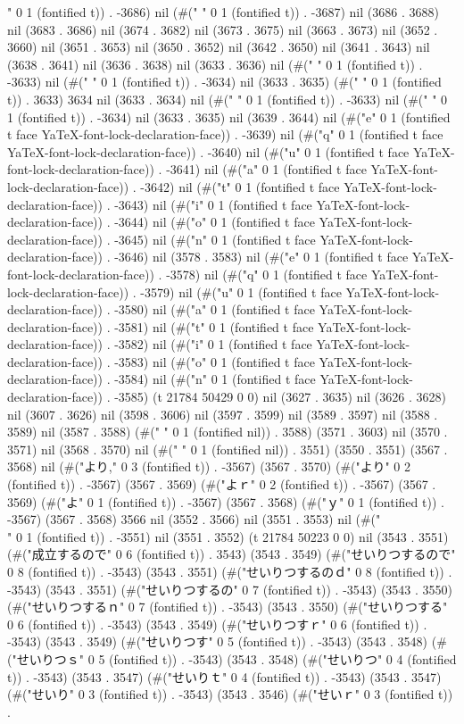 " 0 1 (fontified t)) . -3686) nil (#(" " 0 1 (fontified t)) . -3687) nil (3686 . 3688) nil (3683 . 3686) nil (3674 . 3682) nil (3673 . 3675) nil (3663 . 3673) nil (3652 . 3660) nil (3651 . 3653) nil (3650 . 3652) nil (3642 . 3650) nil (3641 . 3643) nil (3638 . 3641) nil (3636 . 3638) nil (3633 . 3636) nil (#("
" 0 1 (fontified t)) . -3633) nil (#(" " 0 1 (fontified t)) . -3634) nil (3633 . 3635) (#(" " 0 1 (fontified t)) . 3633) 3634 nil (3633 . 3634) nil (#("
" 0 1 (fontified t)) . -3633) nil (#(" " 0 1 (fontified t)) . -3634) nil (3633 . 3635) nil (3639 . 3644) nil (#("e" 0 1 (fontified t face YaTeX-font-lock-declaration-face)) . -3639) nil (#("q" 0 1 (fontified t face YaTeX-font-lock-declaration-face)) . -3640) nil (#("u" 0 1 (fontified t face YaTeX-font-lock-declaration-face)) . -3641) nil (#("a" 0 1 (fontified t face YaTeX-font-lock-declaration-face)) . -3642) nil (#("t" 0 1 (fontified t face YaTeX-font-lock-declaration-face)) . -3643) nil (#("i" 0 1 (fontified t face YaTeX-font-lock-declaration-face)) . -3644) nil (#("o" 0 1 (fontified t face YaTeX-font-lock-declaration-face)) . -3645) nil (#("n" 0 1 (fontified t face YaTeX-font-lock-declaration-face)) . -3646) nil (3578 . 3583) nil (#("e" 0 1 (fontified t face YaTeX-font-lock-declaration-face)) . -3578) nil (#("q" 0 1 (fontified t face YaTeX-font-lock-declaration-face)) . -3579) nil (#("u" 0 1 (fontified t face YaTeX-font-lock-declaration-face)) . -3580) nil (#("a" 0 1 (fontified t face YaTeX-font-lock-declaration-face)) . -3581) nil (#("t" 0 1 (fontified t face YaTeX-font-lock-declaration-face)) . -3582) nil (#("i" 0 1 (fontified t face YaTeX-font-lock-declaration-face)) . -3583) nil (#("o" 0 1 (fontified t face YaTeX-font-lock-declaration-face)) . -3584) nil (#("n" 0 1 (fontified t face YaTeX-font-lock-declaration-face)) . -3585) (t 21784 50429 0 0) nil (3627 . 3635) nil (3626 . 3628) nil (3607 . 3626) nil (3598 . 3606) nil (3597 . 3599) nil (3589 . 3597) nil (3588 . 3589) nil (3587 . 3588) (#(" " 0 1 (fontified nil)) . 3588) (3571 . 3603) nil (3570 . 3571) nil (3568 . 3570) nil (#(" " 0 1 (fontified nil)) . 3551) (3550 . 3551) (3567 . 3568) nil (#("より," 0 3 (fontified t)) . -3567) (3567 . 3570) (#("より" 0 2 (fontified t)) . -3567) (3567 . 3569) (#("よｒ" 0 2 (fontified t)) . -3567) (3567 . 3569) (#("よ" 0 1 (fontified t)) . -3567) (3567 . 3568) (#("ｙ" 0 1 (fontified t)) . -3567) (3567 . 3568) 3566 nil (3552 . 3566) nil (3551 . 3553) nil (#("\\" 0 1 (fontified t)) . -3551) nil (3551 . 3552) (t 21784 50223 0 0) nil (3543 . 3551) (#("成立するので" 0 6 (fontified t)) . 3543) (3543 . 3549) (#("せいりつするので" 0 8 (fontified t)) . -3543) (3543 . 3551) (#("せいりつするのｄ" 0 8 (fontified t)) . -3543) (3543 . 3551) (#("せいりつするの" 0 7 (fontified t)) . -3543) (3543 . 3550) (#("せいりつするｎ" 0 7 (fontified t)) . -3543) (3543 . 3550) (#("せいりつする" 0 6 (fontified t)) . -3543) (3543 . 3549) (#("せいりつすｒ" 0 6 (fontified t)) . -3543) (3543 . 3549) (#("せいりつす" 0 5 (fontified t)) . -3543) (3543 . 3548) (#("せいりつｓ" 0 5 (fontified t)) . -3543) (3543 . 3548) (#("せいりつ" 0 4 (fontified t)) . -3543) (3543 . 3547) (#("せいりｔ" 0 4 (fontified t)) . -3543) (3543 . 3547) (#("せいり" 0 3 (fontified t)) . -3543) (3543 . 3546) (#("せいｒ" 0 3 (fontified t)) . 